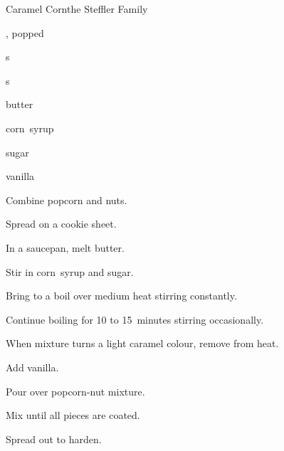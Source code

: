 \begin{recipe}{Caramel Corn}{the Steffler Family}{}

\begin{ingredients}
\item {} , popped
\item \C{\half} s
\item \C{\half} s
\item \C{\half} butter
\item \C{\quarter} corn~syrup
\item \C{\twothird} sugar
\item {} vanilla
\end{ingredients}

\begin{directions}
\item Combine popcorn and nuts.
\item Spread on a cookie sheet.
\item In a saucepan, melt butter.
\item Stir in corn~syrup and sugar.
\item Bring to a boil over medium heat stirring constantly.
\item Continue boiling for 10 to 15~minutes stirring occasionally.
\item When mixture turns a light caramel colour, remove from heat.
\item Add vanilla.
\item Pour over popcorn-nut mixture.
\item Mix until all pieces are coated.
\item Spread out to harden.
\end{directions}
\end{recipe}
